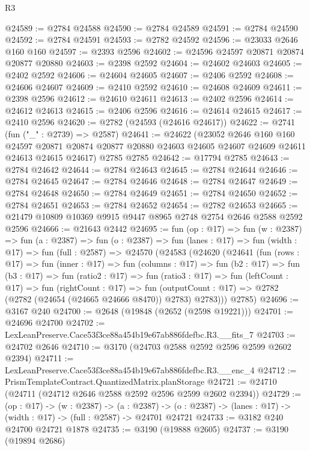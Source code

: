 \begin{lexlean}{R3}
\begin{coremodule}
@24589 := @2784 @24588
@24590 := @2784 @24589
@24591 := @2784 @24590
@24592 := @2784 @24591
@24593 := @2782 @24592
@24596 := @23033 @2646 @160 @160
@24597 := @2393 @2596
@24602 := @24596 @24597 @20871 @20874 @20877 @20880
@24603 := @2398 @2592
@24604 := @24602 @24603
@24605 := @2402 @2592
@24606 := @24604 @24605
@24607 := @2406 @2592
@24608 := @24606 @24607
@24609 := @2410 @2592
@24610 := @24608 @24609
@24611 := @2398 @2596
@24612 := @24610 @24611
@24613 := @2402 @2596
@24614 := @24612 @24613
@24615 := @2406 @2596
@24616 := @24614 @24615
@24617 := @2410 @2596
@24620 := @2782 (@24593 (@24616 @24617))
@24622 := @2741 (fun ("_" : @2739) => @2587)
@24641 := @24622
    (@23052
      @2646
      @160
      @160
      @24597
      @20871
      @20874
      @20877
      @20880
      @24603
      @24605
      @24607
      @24609
      @24611
      @24613
      @24615
      @24617)
    @2785
    @2785
@24642 := @17794 @2785
@24643 := @2784 @24642
@24644 := @2784 @24643
@24645 := @2784 @24644
@24646 := @2784 @24645
@24647 := @2784 @24646
@24648 := @2784 @24647
@24649 := @2784 @24648
@24650 := @2784 @24649
@24651 := @2784 @24650
@24652 := @2784 @24651
@24653 := @2784 @24652
@24654 := @2782 @24653
@24665 := @21479 @10809 @10369 @9915 @9447 @8965 @2748 @2754 @2646 @2588 @2592 @2596
@24666 := @21643 @2442
@24695 := fun (op : @17) =>
  fun (w : @2387) =>
  fun (a : @2387) =>
  fun (o : @2387) =>
  fun (lanes : @17) =>
  fun (width : @17) =>
  fun (full : @2587) =>
  @24570
    (@24583
      (@24620
        (@24641
          (fun (rows : @17) =>
          fun (inner : @17) =>
          fun (columns : @17) =>
          fun (b2 : @17) =>
          fun (b3 : @17) =>
          fun (ratio2 : @17) =>
          fun (ratio3 : @17) =>
          fun (leftCount : @17) =>
          fun (rightCount : @17) =>
          fun (outputCount : @17) => @2782 (@2782 (@24654 (@24665 @24666 @8470)) @2783) @2783)))
      @2785)
@24696 := @3167 @240
@24700 := @2648 (@19848 (@2652 (@2598 @19221)))
@24701 := @24696 @24700
@24702 := LexLeanPreserve.Cace53f3ce88a454b19e67ab886fdefbc.R3.__fits_7
@24703 := @24702 @2646
@24710 := @3170 (@24703 @2588 @2592 @2596 @2599 @2602 @2394)
@24711 := LexLeanPreserve.Cace53f3ce88a454b19e67ab886fdefbc.R3.__enc_4
@24712 := PrismTemplateContract.QuantizedMatrix.planStorage
@24721 := @24710 (@24711 (@24712 @2646 @2588 @2592 @2596 @2599 @2602 @2394))
@24729 := (op : @17) ->
  (w : @2387) ->
  (a : @2387) -> (o : @2387) -> (lanes : @17) -> (width : @17) -> (full : @2587) -> @24701 @24721
@24733 := @3182 @240 @24700 @24721 @1878
@24735 := @3190 (@19888 @2605)
@24737 := @3190 (@19894 @2686)

\end{coremodule}
\end{lexlean}
